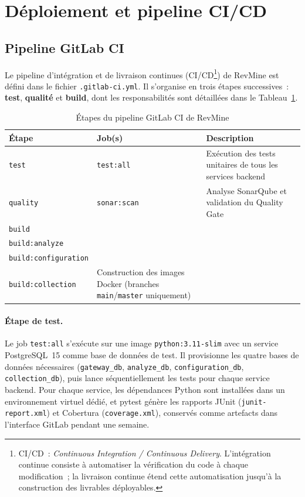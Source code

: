 \section{Déploiement et pipeline CI/CD}

\subsection{Pipeline GitLab CI}

Le pipeline d'intégration et de livraison continues (CI/CD\footnote{CI/CD~: \textit{Continuous
Integration / Continuous Delivery}. L'intégration continue consiste à automatiser la vérification
du code à chaque modification~; la livraison continue étend cette automatisation jusqu'à la
construction des livrables déployables.}) de RevMine est défini dans le fichier
\texttt{.gitlab-ci.yml}. Il s'organise en trois étapes successives~: \textbf{test},
\textbf{qualité} et \textbf{build}, dont les responsabilités sont détaillées dans le
Tableau~\ref{tab:pipeline-ci}.

\begin{table}[H]
\centering
\small
\caption{Étapes du pipeline GitLab CI de RevMine}
\label{tab:pipeline-ci}
\begin{tabular}{|>{\raggedright\arraybackslash}p{2cm}
                |>{\raggedright\arraybackslash}p{4.5cm}
                |>{\raggedright\arraybackslash}p{6.5cm}|}
\hline
\textbf{Étape} & \textbf{Job(s)} & \textbf{Description} \\
\hline
\texttt{test} & \texttt{test:all} & Exécution des tests unitaires de tous les services backend \\
\hline
\texttt{quality} & \texttt{sonar:scan} & Analyse SonarQube et validation du Quality Gate \\
\hline
\texttt{build} & \makecell[l]{\texttt{build:api-gateway} \\ \texttt{build:analyze} \\ \texttt{build:configuration} \\ \texttt{build:collection}} & Construction des images Docker (branches \texttt{main}/\texttt{master} uniquement) \\
\hline
\end{tabular}
\end{table}

\paragraph{Étape de test.} Le job \texttt{test:all} s'exécute sur une image
\texttt{python:3.11-slim} avec un service PostgreSQL~15 comme base de données de test. Il
provisionne les quatre bases de données nécessaires (\texttt{gateway\_db}, \texttt{analyze\_db},
\texttt{configuration\_db}, \texttt{collection\_db}), puis lance séquentiellement les tests pour
chaque service backend. Pour chaque service, les dépendances Python sont installées dans un
environnement virtuel dédié, et pytest génère les rapports JUnit (\texttt{junit-report.xml}) et
Cobertura (\texttt{coverage.xml}), conservés comme artefacts dans l'interface GitLab pendant
une semaine.

